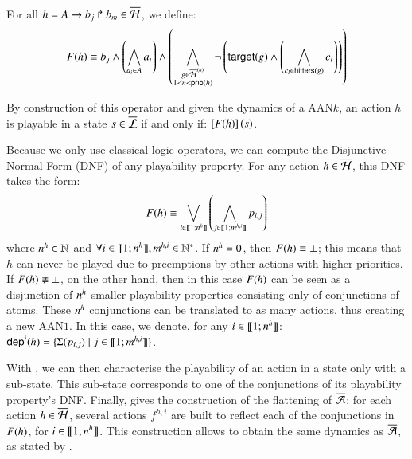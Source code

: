 \begin{definition}\label{def:fop}
  For all $h = A\rightarrow b_j\Rsh b_m \in \overline{\mathcal{H}}$, we define:
  \[
    F(h) \equiv
    b_j \wedge
    \left(\bigwedge_{a_i \in A} a_i\right)
    \wedge
      \left( \bigwedge_{\substack{g \in \overline{\mathcal{H}}^{(n)}\\1 < n < \mathsf{prio}(h)}}
      \neg \left( \mathsf{target}(g) \wedge \left(\bigwedge_{c_l \in \mathsf{hitters}(g)} c_l\right)\right) \right)
  \]
\end{definition}
%
By construction of this operator and given the dynamics of a AAN$k$,
an action $h$ is playable in a state $s \in \overline{\mathcal{L}}$ if and only if: $\left[F(h)\right](s)$.

Because we only use classical logic operators, we can compute the Disjunctive Normal Form (DNF) of any playability property.
For any action $h \in \overline{\mathcal{H}}$, this DNF takes the form:
\[F(h) \equiv \bigvee_{i \in \llbracket 1; n^{h} \rrbracket} \left( \bigwedge_{j \in \llbracket 1; m^{h,i} \rrbracket} p_{i,j} \right)\]
where $n^{h} \in \mathbb{N}$ and $\forall i \in \llbracket 1; n^{h} \rrbracket, m^{h,i} \in \mathbb{N}^*$.
If $n^{h} = 0$, then $F(h) \equiv \bot$; this means that $h$ can never be played
due to preemptions by other actions with higher priorities.
If $F(h) \not\equiv \bot$, on the other hand, then in this case $F(h)$
can be seen as a disjunction of $n^{h}$ smaller playability properties consisting only of conjunctions of atoms.
These $n^{h}$ conjunctions can be translated to as many actions,
thus creating a new AAN$1$.
In this case, we denote, for any $i \in \llbracket 1; n^{h} \rrbracket$:
$\mathsf{dep}^{i}(h) = \{ \Sigma(p_{i,j}) \mid j \in \llbracket 1; m^{h,i} \rrbracket \}$.

With , we can then characterise the playability of an action in a state only with a sub-state.
This sub-state corresponds to one of the conjunctions of its playability property's DNF.
Finally,  gives the construction of the flattening of $\overline{\mathcal{A}}$:
for each action $h \in \overline{\mathcal{H}}$, several actions $f^{h,i}$ are built to reflect each of the conjunctions in $F(h)$,
\ie for $i \in \llbracket 1; n^{h} \rrbracket$.
This construction allows to obtain the same dynamics as $\overline{\mathcal{A}}$, as stated by .

